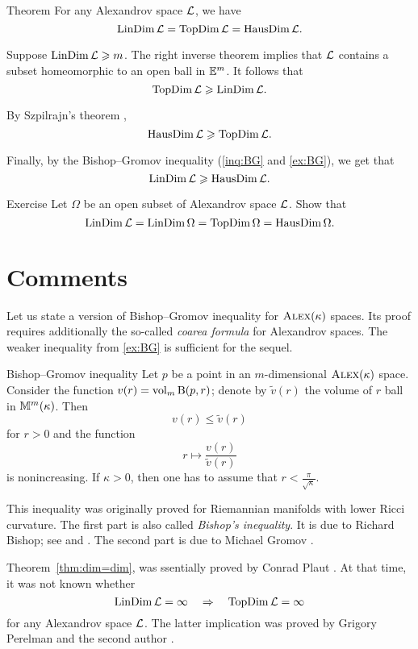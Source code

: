 \begin{thm}{Theorem}\label{thm:dim=dim}
For any Alexandrov space $\mathcal{L}$, we have
\[\mathop{\rm LinDim}\nolimits \mathcal{L}=\mathop{\rm TopDim}\nolimits \mathcal{L}=\mathop{\rm HausDim}\nolimits \mathcal{L}.\]
\end{thm}

Suppose $\mathop{\rm LinDim}\nolimits\mathcal{L}\geqslant m$.
The right inverse theorem implies that $\mathcal{L}$ contains a subset homeomorphic to an open ball in $\mathbb{E}^m$.
It follows that
\[\mathop{\rm TopDim}\nolimits\mathcal{L}\geqslant \mathop{\rm LinDim}\nolimits\mathcal{L}.\]

By Szpilrajn's theorem \cite[theorems V 8 and VII 2]{hurewicz-wallman}, 
\[\mathop{\rm HausDim}\nolimits\mathcal{L}\geqslant\mathop{\rm TopDim}\nolimits\mathcal{L}.\]

Finally, by the Bishop--Gromov inequality (\ref{inq:BG} and \ref{ex:BG}), we get that 
\[\mathop{\rm LinDim}\nolimits \mathcal{L}\geqslant \mathop{\rm HausDim}\nolimits\mathcal{L}.\]
\qedsf

\begin{thm}{Exercise}\label{ex:dim=dim}
Let $\Omega$ be an open subset of Alexandrov space $\mathcal{L}$.
Show that 
\[\mathop{\rm LinDim}\nolimits \mathcal{L}=\mathop{\rm LinDim}\nolimits \Omega=\mathop{\rm TopDim}\nolimits \Omega=\mathop{\rm HausDim}\nolimits \Omega.\]
\end{thm}

\section{Comments}

Let us state a version of Bishop--Gromov inequality for $\textsc{Alex}(\kappa)$ spaces.
Its proof requires additionally the so-called \textit{coarea formula} for Alexandrov spaces. 
The weaker inequality from \ref{ex:BG} is sufficient for the sequel.

\begin{thm}{Bishop--Gromov inequality}\label{inq:BG+}
Let $p$ be a point in an $m$-dimensional $\textsc{Alex}(\kappa)$ space.
Consider the function $v(r)\z=\vol_m\oBall(p,r)$;
denote by $\tilde v(r)$ the volume of $r$ ball in $\mathbb{M}^m(\kappa)$.
Then 
\[v(r)\le \tilde v(r)\]
for $r>0$ and the function 
\[r\mapsto \frac{v(r)}{\tilde v(r)}\] is nonincreasing.
If $\kappa>0$, then one has to assume that $r<\tfrac\pi{\sqrt\kappa}$.
\end{thm}

This inequality was originally proved for Riemannian manifolds with lower Ricci curvature.
The first part is also called \emph{Bishop's inequality}.
It is due to Richard Bishop; see \cite{bishop1964} and \cite[Corollary 4, p. 256]{bishop-crittenden}.
The second part is due to Michael Gromov \cite{gromov1981}.

Theorem~\ref{thm:dim=dim}, was ssentially proved by Conrad Plaut \cite{plaut:dimension}.
At that time, it was not known whether
\[\mathop{\rm LinDim}\nolimits\mathcal{L}=\infty\quad \Rightarrow\quad \mathop{\rm TopDim}\nolimits\mathcal{L}=\infty\]
for any Alexandrov space $\mathcal{L}$.
The latter implication was proved by Grigory Perelman and the second author \cite{perelman-petrunin:qg}.

